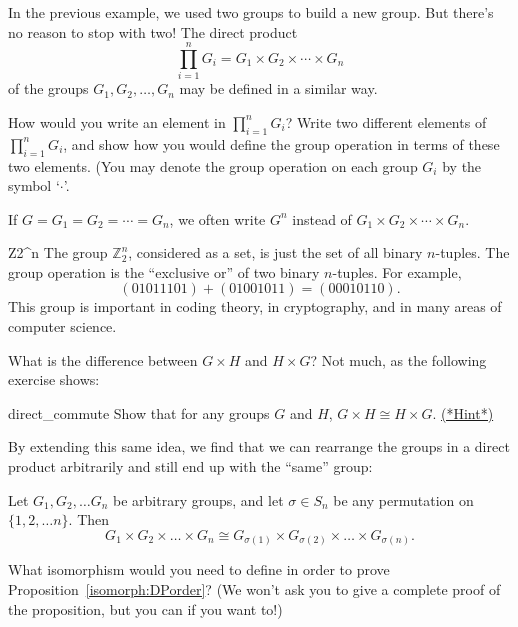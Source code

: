 In the previous example, we used two groups to build a new group. But there's no reason to stop with two! The direct product
\[
\prod_{i = 1}^n G_i = G_1 \times G_2 \times \cdots \times G_n
\]
of the groups $G_1, G_2, \ldots, G_n$ may be defined in a similar way. 

\begin{exercise}{}
How would you write an element in $\prod_{i = 1}^n G_i$? Write two different elements of $\prod_{i = 1}^n G_i$, and show how you would define the group operation in terms of these two elements. (You may denote the group operation on each group $G_i$ by the symbol `$\cdot$'.
\end{exercise}	

If $G = G_1 = G_2 = \cdots = G_n$, we often write $G^n$ instead of $G_1 \times G_2 \times \cdots \times G_n$.
 
\begin{example}{Z2^n}
The group ${\mathbb Z}_2^n$, considered as a set, is just the set of all
binary $n$-tuples. The group operation is the ``exclusive or'' of two
binary $n$-tuples. For example, 
\[
(01011101) + (01001011) = (00010110).
\]
This group is important in coding theory, in cryptography, and in many
areas of computer science.  
\end{example}

What is the difference between $G \times H$ and $H \times G$?  Not much, as the following exercise shows:
 
\begin{exercise}{direct_commute}
Show that for any groups $G$ and $H$,  $G \times H \cong H \times G$.
\hyperref[sec:isomorph:hints]{(*Hint*)}
\end{exercise}

By extending this same idea, we find that we can rearrange the groups in a direct product arbitrarily and still end up with the ``same'' group:

\begin{thm}\label{isomorph:DPorder}
Let $G_1,G_2, \ldots G_n$ be arbitrary groups, and let  $\sigma \in S_n$ be any permutation on $\{1,2,\ldots n\}$. Then
\[ G_1 \times G_2 \times \ldots \times G_n \cong G_{\sigma(1)} \times G_{\sigma(2)} \times \ldots \times G_{\sigma(n)}.\]
\end{thm}

\begin{exercise}{}
What isomorphism would you need to define in order to prove Proposition~\ref{isomorph:DPorder}? (We won't ask you to give a complete proof of the proposition, but you can if you want to!)
\end{exercise}

